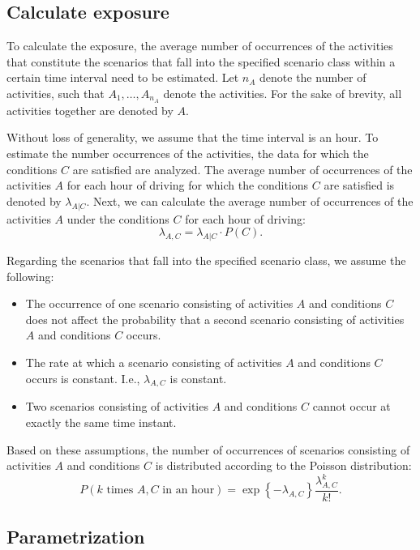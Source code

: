 \subsection{Calculate exposure}
\label{sec:exposure}

To calculate the exposure, the average number of occurrences of the activities that constitute the scenarios that fall into the specified scenario class within a certain time interval need to be estimated. Let $n_A$ denote the number of activities, such that $A_1, \ldots, A_{n_A}$ denote the activities. For the sake of brevity, all activities together are denoted by $A$. 

Without loss of generality, we assume that the time interval is an hour. To estimate the number occurrences of the activities, the data for which the conditions $C$ are satisfied are analyzed. The average number of occurrences of the activities $A$ for each hour of driving for which the conditions $C$ are satisfied is denoted by $\lambda_{A|C}$. Next, we can calculate the average number of occurrences of the activities $A$ under the conditions $C$ for each hour of driving:
\begin{equation}
	\lambda_{A,C} = \lambda_{A|C} \cdot P(C).
\end{equation}

Regarding the scenarios that fall into the specified scenario class, we assume the following:
\begin{itemize}
	\item The occurrence of one scenario consisting of activities $A$ and conditions $C$ does not affect the probability that a second scenario consisting of activities $A$ and conditions $C$ occurs.
	\item The rate at which a scenario consisting of activities $A$ and conditions $C$ occurs is constant. I.e., $\lambda_{A,C}$ is constant.
	\item Two scenarios consisting of activities $A$ and conditions $C$ cannot occur at exactly the same time instant.
\end{itemize}
Based on these assumptions, the number of occurrences of scenarios consisting of activities $A$ and conditions $C$ is distributed according to the Poisson distribution:
\begin{equation}
	P(k\text{ times }A,C\text{ in an hour}) = \exp \left\{-\lambda_{A,C} \right\} \frac{\lambda_{A,C}^k}{k!}.
\end{equation}



\subsection{Parametrization}
\label{sec:parametrization}

